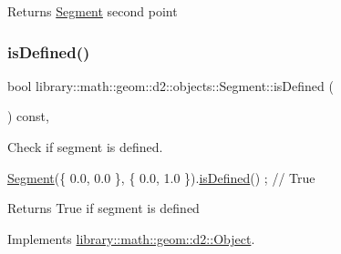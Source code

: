 \begin{DoxyReturn}{Returns}
\hyperlink{classlibrary_1_1math_1_1geom_1_1d2_1_1objects_1_1_segment}{Segment} second point 
\end{DoxyReturn}
\mbox{\label{classlibrary_1_1math_1_1geom_1_1d2_1_1objects_1_1_segment_a2c366d74328cdce4a7e83a761a84dbc7}} 
\subsubsection{\texorpdfstring{is\+Defined()}{isDefined()}}
{\footnotesize\ttfamily bool library\+::math\+::geom\+::d2\+::objects\+::\+Segment\+::is\+Defined (\begin{DoxyParamCaption}{ }\end{DoxyParamCaption}) const\hspace{0.3cm}{\ttfamily [override]}, {\ttfamily [virtual]}}



Check if segment is defined. 


\begin{DoxyCode}
\hyperlink{classlibrary_1_1math_1_1geom_1_1d2_1_1objects_1_1_segment_a44ba44fd5f02a02fe34c40223b38fa8f}{Segment}(\{ 0.0, 0.0 \}, \{ 0.0, 1.0 \}).\hyperlink{classlibrary_1_1math_1_1geom_1_1d2_1_1objects_1_1_segment_a2c366d74328cdce4a7e83a761a84dbc7}{isDefined}() ; \textcolor{comment}{// True}
\end{DoxyCode}


\begin{DoxyReturn}{Returns}
True if segment is defined 
\end{DoxyReturn}


Implements \hyperlink{classlibrary_1_1math_1_1geom_1_1d2_1_1_object_ae9506254971168a3ca63e1923556b70d}{library\+::math\+::geom\+::d2\+::\+Object}.

\mbox{\label{classlibrary_1_1math_1_1geom_1_1d2_1_1objects_1_1_segment_a0ed58e12b0d91a83fdea0c13308a3d37}} 

